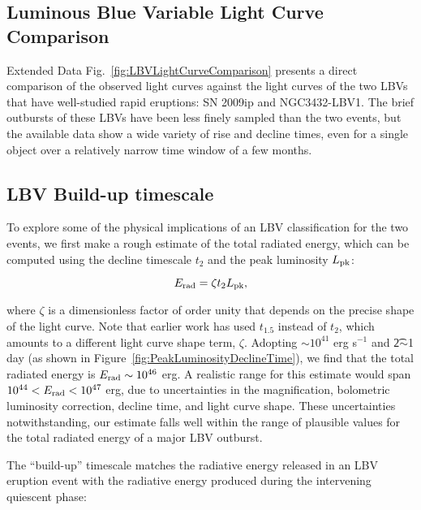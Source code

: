 \subsection{Luminous Blue Variable Light Curve Comparison}
\label{sec:LBVlightcurves}

Extended Data Fig.~\ref{fig:LBVLightCurveComparison} presents a direct
comparison of the observed \spock light curves against the light
curves of the two LBVs that have well-studied rapid eruptions: SN
2009ip and NGC3432-LBV1. The brief outbursts of these LBVs have been
less finely sampled than the two \spock events, but the available data
show a wide variety of rise and decline times, even for a single
object over a relatively narrow time window of a few months.


\subsection{LBV Build-up timescale}\label{sec:LBVbuildup}

To explore some of the physical implications of an LBV classification
for the two \spock events, we first make a rough estimate of the total
radiated energy, which can be computed using the decline timescale
$t_2$ and the peak luminosity $L_{\rm pk}$:

\begin{equation}
  \label{eqn:Erad}
  E_{\rm rad} = \zeta \t2 \Lpk,
\end{equation}

\noindent where $\zeta$ is a dimensionless factor of order unity that
depends on the precise shape of the light curve\cite{Smith:2011b}. Note that
 earlier work\cite{Smith:2011b} has used $t_{1.5}$ instead of $t_2$, which amounts to
  a different light curve shape term, $\zeta$.  Adopting
\Lpk$\sim10^{41}$ erg s$^{-1}$ and \t2$\sim$1 day (as shown in
Figure~\ref{fig:PeakLuminosityDeclineTime}), we find that the total
radiated energy is $E_{\rm rad}\sim10^{46}$ erg.  A realistic range
for this estimate would span $10^{44}<E_{\rm rad}<10^{47}$ erg, due to
uncertainties in the magnification, bolometric luminosity correction,
decline time, and light curve shape. These uncertainties
notwithstanding, our estimate falls well within the range of
plausible values for the total radiated energy of a major LBV
outburst.

The ``build-up'' timescale\citep{Smith:2011b} matches the radiative
energy released in an LBV eruption event with the radiative energy
produced during the intervening quiescent phase:

